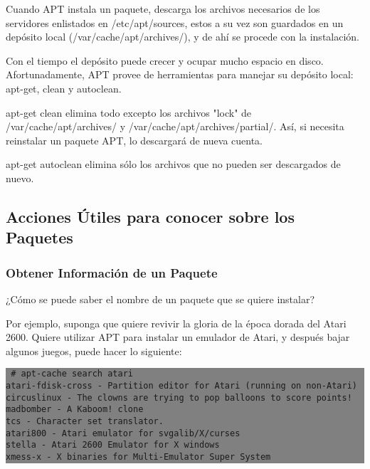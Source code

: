 \documentclass[12pt]{article}
\begin{document}
Cuando APT instala un paquete, descarga los archivos necesarios de los servidores enlistados en /etc/apt/sources, estos a su vez son guardados en un depósito local (/var/cache/apt/archives/), y de ahí se procede con la instalación.

Con el tiempo el depósito puede crecer y ocupar mucho espacio en disco. Afortunadamente, APT provee de herramientas para manejar su depósito local: apt-get, clean y autoclean.

apt-get clean elimina todo excepto los archivos "lock" de /var/cache/apt/archives/ y /var/cache/apt/archives/partial/. Así, si necesita reinstalar un paquete APT, lo descargará de nueva cuenta.

apt-get autoclean elimina sólo los archivos que no pueden ser descargados de nuevo.

\subsection*{Acciones Útiles para conocer sobre los Paquetes}
\subsubsection*{Obtener Información de un Paquete}

 ¿Cómo se puede saber el nombre de un paquete que se quiere instalar?

Por ejemplo, suponga que quiere revivir la gloria de la época dorada del Atari 2600. Quiere utilizar APT para instalar un emulador de Atari, y después bajar algunos juegos, puede hacer lo siguiente:

\colorbox{grey}{\parbox[t]{0.95\linewidth}{ \vspace*{0.5cm} {\tt
     \# apt-cache search atari\\
     atari-fdisk-cross - Partition editor for Atari (running on non-Atari)\\
     circuslinux - The clowns are trying to pop balloons to score points!\\
     madbomber - A Kaboom! clone\\
     tcs - Character set translator.\\
     atari800 - Atari emulator for svgalib/X/curses\\
     stella - Atari 2600 Emulator for X windows\\
     xmess-x - X binaries for Multi-Emulator Super System\\
 } \vspace*{0.5cm} } } 
\end{document}
